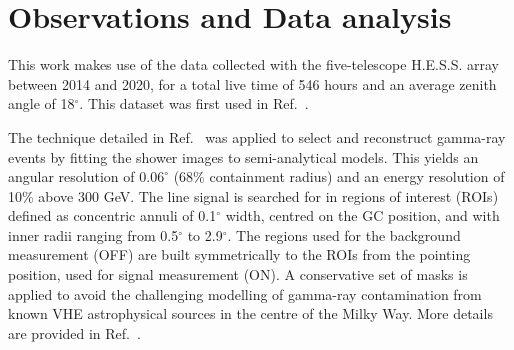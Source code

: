 \documentclass[aps,prl,twocolumn,floats,balancelastpage,showpacs,showkeys,preprintnumbers,floatfix,nofootinbib,superscriptaddress, longbibliography]{revtex4-1}
\begin{document}
\section{Observations and Data analysis}
\label{sec:analysis}
This work makes use of the data collected with the five-telescope H.E.S.S. array between 2014 and 2020, for a total live time of 546 hours and an average zenith angle of 18$^\circ$. This dataset was first used in Ref.~\cite{HESS:2022ygk}.


The technique detailed in Ref.~\cite{deNaurois:2009ud} was applied to select and reconstruct gamma-ray events by fitting the shower images to semi-analytical models.
This yields an angular resolution of $0.06^\circ$ (68\% containment radius) and an energy resolution of 10\% above 300 GeV. The line signal is searched for in regions of interest (ROIs) defined as concentric annuli of 0.1$^\circ$ width, centred on the GC position, and with inner radii ranging from 0.5$^\circ$ to 2.9$^\circ$. The regions used for the background measurement (OFF) are built symmetrically to the ROIs from the pointing position, used for signal measurement (ON). A conservative set of masks is applied to avoid the challenging modelling of gamma-ray contamination from known VHE astrophysical sources in the centre of the Milky Way. More details are provided in Ref.~\cite{supplement}.
\end{document}
